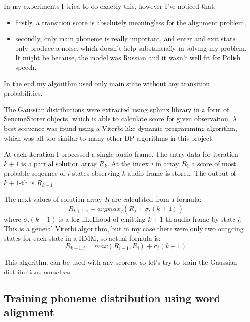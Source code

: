 \documentclass[12pt,a4paper,english]{article}
\begin{document}
In my experiments I tried to do exactly this, however I've noticed that:
\begin{itemize}
    \item firstly, a transition score is absolutely meaningless for the alignment problem,
    \item secondly, only main phoneme is really important, and enter and exit state only produce a noise, which doesn't help substantially in solving my problem. It might be because, the model was Russian and it wasn't well fit for Polish speech.
\end{itemize}
In the end my algorithm used only main state without any transition probabilities. \newline

The Gaussian distributions were extracted using sphinx library in a form of SenomeScorer objects, which is able to calculate score for given observation. A best sequence was found using a Viterbi like dynamic programming algorithm, which was all too similar to many other DP algorithms in this project. \newline

At each iteration I processed a single audio frame.\newline
The entry data for iteration $k+1$ is a partial solution array $R_k$. At the index $i$ in array $R_k$ a score of most probable seqeunce of $i$ states observing $k$ audio frame is stored. The output of$k+1$-th is $R_{k+1}$. \newline 

The next values of solution array $R$ are calculated from a formula:
\begin{equation}
    R_{k+1, i} = argmax_j (R_j + \sigma_i(k+1))
\end{equation}
where $\sigma_i(k+1)$ is a log likelihood of emitting $k+1$-th audio frame by state $i$. \newline
This is a general Viterbi algorithm, but in my case there were only two outgoing states for each state in a HMM, so actual formula is:
\begin{equation}
    R_{k+1, i} = max(R_{i-1}, R_{i}) + \sigma_i(k+1)
\end{equation}

\newpage
This algorithm can be used with any scorers, so let's try to train the Gaussian distributions ourselves.

\subsection{Training phoneme distribution using word alignment}
\end{document}
